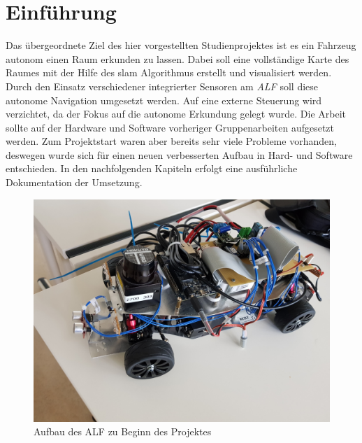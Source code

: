 

\chapter{Einführung}



Das übergeordnete Ziel des hier vorgestellten Studienprojektes ist es ein Fahrzeug autonom einen Raum erkunden zu lassen. Dabei soll eine vollständige Karte des Raumes mit der Hilfe des \acrfull{slam} Algorithmus erstellt und visualisiert werden. Durch den Einsatz verschiedener integrierter Sensoren am \textit{ALF} soll diese autonome Navigation umgesetzt werden. 
Auf eine externe Steuerung wird verzichtet, da der Fokus auf die autonome Erkundung gelegt wurde. Die Arbeit sollte auf der Hardware und Software vorheriger Gruppenarbeiten aufgesetzt werden. Zum Projektstart waren aber bereits sehr viele Probleme vorhanden, deswegen wurde sich für einen neuen verbesserten Aufbau in Hard- und Software entschieden. In den nachfolgenden Kapiteln erfolgt eine ausführliche Dokumentation der Umsetzung.


\begin{figure}[hbtp]
\centering
\includegraphics[scale=0.105]{images/chapter2/alf_old.jpg}
\caption{Aufbau des ALF zu Beginn des Projektes}
\label{fig:alf_old}
\end{figure}